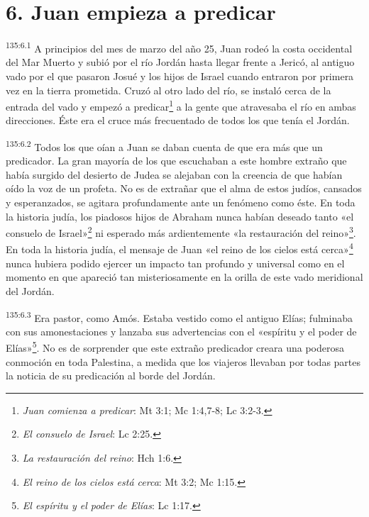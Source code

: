 \section*{6. Juan empieza a predicar}
\par
\textsuperscript{135:6.1} A principios del mes de marzo del año 25, Juan rodeó la costa occidental del Mar Muerto y subió por el río Jordán hasta llegar frente a Jericó, al antiguo vado por el que pasaron Josué y los hijos de Israel cuando entraron por primera vez en la tierra prometida. Cruzó al otro lado del río, se instaló cerca de la entrada del vado y empezó a predicar\footnote{\textit{Juan comienza a predicar}: Mt 3:1; Mc 1:4,7-8; Lc 3:2-3.} a la gente que atravesaba el río en ambas direcciones. Éste era el cruce más frecuentado de todos los que tenía el Jordán.

\par
\textsuperscript{135:6.2} Todos los que oían a Juan se daban cuenta de que era más que un predicador. La gran mayoría de los que escuchaban a este hombre extraño que había surgido del desierto de Judea se alejaban con la creencia de que habían oído la voz de un profeta. No es de extrañar que el alma de estos judíos, cansados y esperanzados, se agitara profundamente ante un fenómeno como éste. En toda la historia judía, los piadosos hijos de Abraham nunca habían deseado tanto «el consuelo de Israel»\footnote{\textit{El consuelo de Israel}: Lc 2:25.} ni esperado más ardientemente «la restauración del reino»\footnote{\textit{La restauración del reino}: Hch 1:6.}. En toda la historia judía, el mensaje de Juan «el reino de los cielos está cerca»\footnote{\textit{El reino de los cielos está cerca}: Mt 3:2; Mc 1:15.} nunca hubiera podido ejercer un impacto tan profundo y universal como en el momento en que apareció tan misteriosamente en la orilla de este vado meridional del Jordán.

\par
\textsuperscript{135:6.3} Era pastor, como Amós. Estaba vestido como el antiguo Elías; fulminaba con sus amonestaciones y lanzaba sus advertencias con el «espíritu y el poder de Elías»\footnote{\textit{El espíritu y el poder de Elías}: Lc 1:17.}. No es de sorprender que este extraño predicador creara una poderosa conmoción en toda Palestina, a medida que los viajeros llevaban por todas partes la noticia de su predicación al borde del Jordán.

